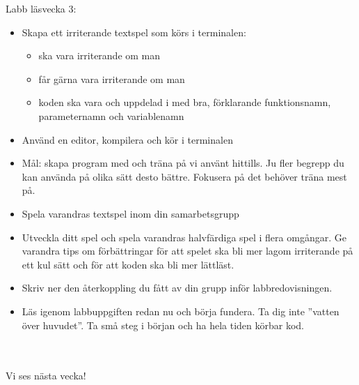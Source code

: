 \begin{SlideExtra}{Labb läsvecka 3:  \texttt{\LabWeekTHREE}}\SlideFontSmall
\begin{itemize}
\item Skapa ett  irriterande textspel som körs i terminalen:
\begin{itemize}\SlideFontTiny
  \item ska vara  irriterande om man 
  \item får gärna vara  irriterande om man 
  \item koden ska vara  och uppdelad i  med bra, förklarande funktionsnamn, parameternamn och variablenamn
\end{itemize}
\item Använd en editor, kompilera och kör i terminalen
\item Mål: skapa  program med  och träna på  vi använt hittills. Ju fler begrepp du kan använda på olika sätt desto bättre. Fokusera på det  behöver träna mest på.
\item Spela varandras textspel inom din samarbetsgrupp
\item Utveckla ditt spel  och spela varandras halvfärdiga spel i flera omgångar. Ge varandra tips om förbättringar för att spelet ska bli mer lagom irriterande på ett kul sätt och för att koden ska bli mer lättläst.
\item Skriv ner den återkoppling du fått av din grupp inför labbredovisningen.
\item Läs igenom labbuppgiften redan nu och börja fundera. Ta dig inte ''vatten över huvudet''. Ta små steg i början och ha hela tiden körbar kod.


\end{itemize}
\end{SlideExtra}
\fi

\ifkompendium\else
\begin{SlideExtra}{}
  \Huge {} \\~\\ Vi ses nästa vecka!
\end{SlideExtra}
\fi 
